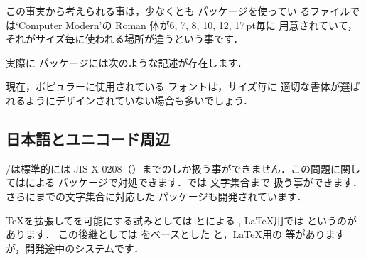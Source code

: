 \begin{Trick}
この事実から考えられる事は，少なくとも  パッケージを使ってい
るファイルでは`Computer Modern'の Roman 体が6, 7, 8, 10, 12, 17\,pt毎に
用意されていて，それがサイズ毎に使われる場所が違うという事です．

実際に  パッケージには次のような記述が存在します．

\begin{InTeX}
\end{InTeX}

現在，ポピュラーに使用されている \PS フォントは，サイズ毎に
適切な書体が選ばれるようにデザインされていない場合も多いでしょう．



\end{Trick}

% 


\subsection{日本語とユニコード周辺}

%
\pTeX/\pLaTeX は標準的には JIS X 0208（）までのしか扱う事ができません．この問題に関してはによる
パッケージで対処できます．では  文字集合まで
扱う事ができます．さらにまでの文字集合に対応した
パッケージも開発されています．

\TeX を拡張してを可能にする試みとしては
とによる
, \LaTeX 用では というのがあります．
この後継としては \eTeX をベースとした と，\LaTeX 用の
等がありますが，\genzai 開発途中のシステムです．

